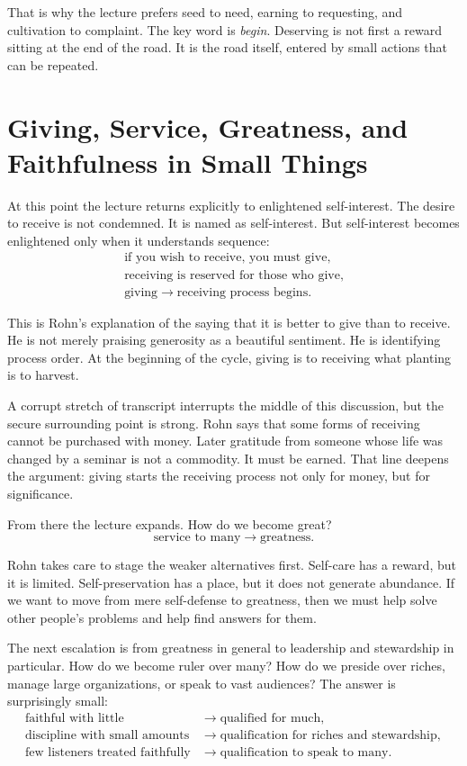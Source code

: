 That is why the lecture prefers seed to need, earning to requesting, and cultivation to complaint. The key word is \emph{begin}. Deserving is not first a reward sitting at the end of the road. It is the road itself, entered by small actions that can be repeated.

\section{Giving, Service, Greatness, and Faithfulness in Small Things}

At this point the lecture returns explicitly to enlightened self-interest. The desire to receive is not condemned. It is named as self-interest. But self-interest becomes enlightened only when it understands sequence:
\begin{align}
\text{if you wish to receive, you must give}, \\
\text{receiving is reserved for those who give}, \\
\text{giving} \rightarrow \text{receiving process begins}.
\end{align}

This is Rohn's explanation of the saying that it is better to give than to receive. He is not merely praising generosity as a beautiful sentiment. He is identifying process order. At the beginning of the cycle, giving is to receiving what planting is to harvest.

A corrupt stretch of transcript interrupts the middle of this discussion, but the secure surrounding point is strong. Rohn says that some forms of receiving cannot be purchased with money. Later gratitude from someone whose life was changed by a seminar is not a commodity. It must be earned. That line deepens the argument: giving starts the receiving process not only for money, but for significance.

From there the lecture expands. How do we become great?
\begin{equation}
\text{service to many} \rightarrow \text{greatness}.
\end{equation}

Rohn takes care to stage the weaker alternatives first. Self-care has a reward, but it is limited. Self-preservation has a place, but it does not generate abundance. If we want to move from mere self-defense to greatness, then we must help solve other people's problems and help find answers for them.

The next escalation is from greatness in general to leadership and stewardship in particular. How do we become ruler over many? How do we preside over riches, manage large organizations, or speak to vast audiences? The answer is surprisingly small:
\begin{align}
\text{faithful with little} &\rightarrow \text{qualified for much}, \\
\text{discipline with small amounts} &\rightarrow \text{qualification for riches and stewardship}, \\
\text{few listeners treated faithfully} &\rightarrow \text{qualification to speak to many}.
\end{align}

